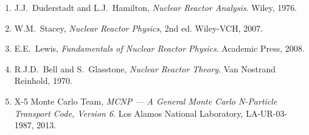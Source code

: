 \documentclass[12pt,a4paper]{article}
\begin{document}
\begin{enumerate}
  \item J.J.\ Duderstadt and L.J.\ Hamilton,
        \textit{Nuclear Reactor Analysis}.
        Wiley, 1976.

  \item W.M.\ Stacey,
        \textit{Nuclear Reactor Physics}, 2nd ed.
        Wiley-VCH, 2007.

  \item E.E.\ Lewis,
        \textit{Fundamentals of Nuclear Reactor Physics}.
        Academic Press, 2008.

  \item R.J.D.\ Bell and S.\ Glasstone,
        \textit{Nuclear Reactor Theory}.
        Van Nostrand Reinhold, 1970.

  \item X-5 Monte Carlo Team,
        \textit{MCNP — A General Monte Carlo N-Particle Transport Code, Version 6}.
        Los Alamos National Laboratory, LA-UR-03-1987, 2013.
\end{enumerate}

\end{document}
